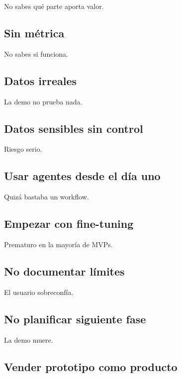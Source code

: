 No sabes qué parte aporta valor.

\subsection{Sin métrica}\label{sin-muxe9trica}

No sabes si funciona.

\subsection{Datos irreales}\label{datos-irreales}

La demo no prueba nada.

\subsection{Datos sensibles sin
control}\label{datos-sensibles-sin-control}

Riesgo serio.

\subsection{Usar agentes desde el día
uno}\label{usar-agentes-desde-el-duxeda-uno}

Quizá bastaba un workflow.

\subsection{Empezar con fine-tuning}\label{empezar-con-fine-tuning}

Prematuro en la mayoría de MVPs.

\subsection{No documentar límites}\label{no-documentar-luxedmites}

El usuario sobreconfía.

\subsection{No planificar siguiente
fase}\label{no-planificar-siguiente-fase}

La demo muere.

\subsection{Vender prototipo como
producto}\label{vender-prototipo-como-producto}

